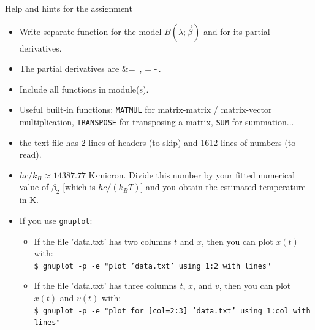 \documentclass[10pt,aspectratio=169,handout]{beamer}
\begin{document}
\begin{frame}{Help and hints for the assignment}
	\begin{itemize}[<+->]
		\item Write separate function for the model $B(\lambda;\vec{\beta})$ and for its partial derivatives.
		\item The partial derivatives are 
		\bea
			 &= \,,\quad
			 = -\,.
		\eea
		\item Include all functions in module(s).
		\item Useful built-in functions: \texttt{MATMUL} for matrix-matrix / matrix-vector multiplication, \texttt{TRANSPOSE} for transposing a matrix, \texttt{SUM} for summation...
		\item the text file has 2 lines of headers (to skip) and 1612 lines of numbers (to read).
		\item $h c/k_B\approx 14387.77$ K$\cdot$micron. Divide this number by your fitted numerical value of $\beta_2$ [which is $h c/(k_B T)$] and you obtain the estimated temperature in K.
		\item If you use \texttt{gnuplot}:
			\begin{itemize}
			\item If the file 'data.txt' has two columns $t$ and $x$, then you can plot $x(t)$ with:\\
			\texttt{\$ gnuplot -p -e "plot 'data.txt' using 1:2 with lines"}
			\item If the file 'data.txt' has three columns $t$, $x$, and $v$, then you can plot $x(t)$ and $v(t)$ with:\\
			\texttt{\$ gnuplot -p -e "plot for [col=2:3] 'data.txt' using 1:col with lines"}
		\end{itemize} 
	\end{itemize}
\end{frame}

\end{document}
